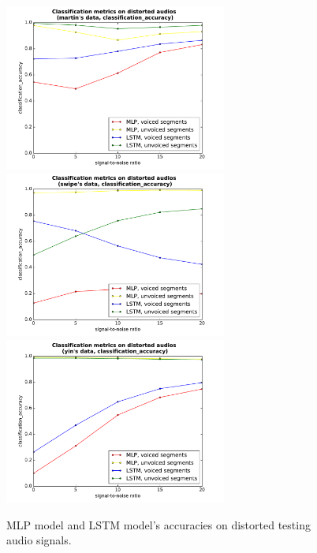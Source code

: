\documentclass[11pt,a4paper]{report}
\begin{document}
\begin{figure}[htbp]
  \centering
  \includegraphics[width=0.65\textwidth]{classification_metrics_voicedness_martin_classification_accuracy.pdf}
  \includegraphics[width=0.65\textwidth]{classification_metrics_voicedness_swipe_classification_accuracy.pdf}
  \includegraphics[width=0.65\textwidth]{classification_metrics_voicedness_yin_classification_accuracy.pdf}
  \caption{MLP model and LSTM model's accuracies on distorted testing audio signals.}
  \label{fig:distorted-testing-data-accuracy}
\end{figure}
\end{document}
